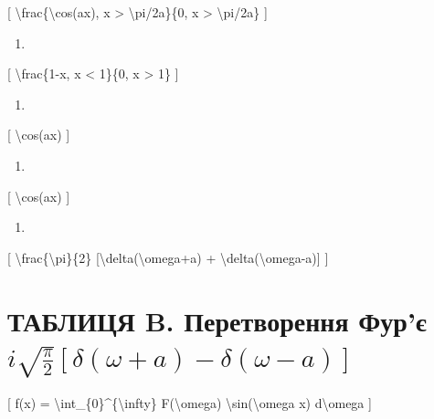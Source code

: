 \documentclass[
]{article}
\providecommand{\tightlist}{%
  \setlength{\itemsep}{0pt}\setlength{\parskip}{0pt}}
\begin{document}
{[} \textbackslash frac\{\textbackslash cos(ax), \textbar x\textbar{}
\textgreater{} \textbackslash pi/2a\}\{0, \textbar x\textbar{}
\textgreater{} \textbackslash pi/2a\} {]}

\begin{enumerate}
\def\labelenumi{\arabic{enumi}.}
\setcounter{enumi}{17}
\tightlist
\item
\end{enumerate}

{[} \textbackslash frac\{1-\textbar x\textbar, \textbar x\textbar{}
\textless{} 1\}\{0, \textbar x\textbar{} \textgreater{} 1\} {]}

\begin{enumerate}
\def\labelenumi{\arabic{enumi}.}
\setcounter{enumi}{18}
\tightlist
\item
\end{enumerate}

{[} \textbackslash cos(ax) {]}

\begin{enumerate}
\def\labelenumi{\arabic{enumi}.}
\setcounter{enumi}{18}
\tightlist
\item
\end{enumerate}

{[} \textbackslash cos(ax) {]}

\begin{enumerate}
\def\labelenumi{\arabic{enumi}.}
\setcounter{enumi}{9}
\tightlist
\item
\end{enumerate}

{[} \textbackslash frac\{\textbackslash pi\}\{2\}
{[}\textbackslash delta(\textbackslash omega+a) +
\textbackslash delta(\textbackslash omega-a){]} {]}

\section{\texorpdfstring{ТАБЛИЦЯ B. Перетворення Фур'є
\(i \sqrt{\frac{\pi}{2}} [\delta(\omega+a) - \delta(\omega-a)]\)}{ТАБЛИЦЯ B. Перетворення Фур'є i \textbackslash sqrt\{\textbackslash frac\{\textbackslash pi\}\{2\}\} {[}\textbackslash delta(\textbackslash omega+a) - \textbackslash delta(\textbackslash omega-a){]}}}\label{ux442ux430ux431ux43bux438ux446ux44f-b.-ux43fux435ux440ux435ux442ux432ux43eux440ux435ux43dux43dux44f-ux444ux443ux440ux454-i-sqrtfracpi2-deltaomegaa---deltaomega-a}

{[} f(x) = \textbackslash int\_\{0\}\^{}\{\textbackslash infty\}
F(\textbackslash omega) \textbackslash sin(\textbackslash omega x)
d\textbackslash omega {]}
\end{document}
